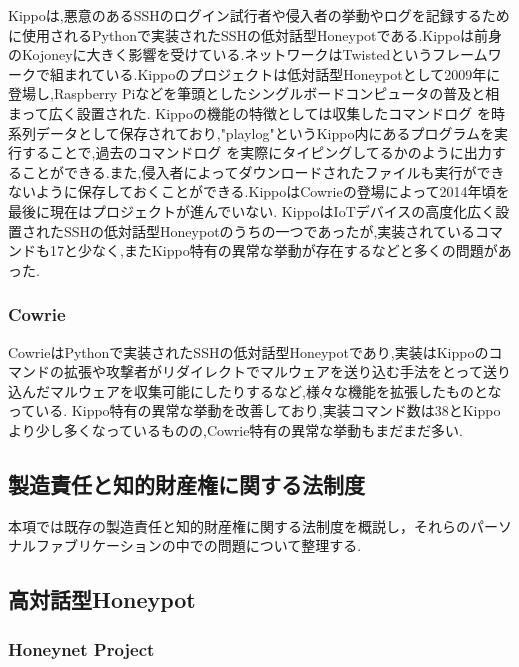 Kippoは,悪意のあるSSHのログイン試行者や侵入者の挙動やログを記録するために使用されるPythonで実装されたSSHの低対話型Honeypotである.\cite{kippo}Kippoは前身のKojoney\cite{kojoney}に大きく影響を受けている.ネットワークはTwisted\cite{twisted}というフレームワークで組まれている.Kippoのプロジェクトは低対話型Honeypotとして2009年に登場し,Raspberry Pi\cite{rasp}などを筆頭としたシングルボードコンピュータ\cite{singleboard}の普及と相まって広く設置された.
Kippoの機能の特徴としては収集したコマンドログ を時系列データとして保存されており,"playlog"というKippo内にあるプログラムを実行することで,過去のコマンドログ を実際にタイピングしてるかのように出力することができる.また,侵入者によってダウンロードされたファイルも実行ができないように保存しておくことができる.KippoはCowrieの登場によって2014年頃を最後に現在はプロジェクトが進んでいない.\cite{kippowiki}
KippoはIoTデバイスの高度化広く設置されたSSHの低対話型Honeypotのうちの一つであったが,実装されているコマンドも17\cite{kippocommand}と少なく,またKippo特有の異常な挙動が存在するなどと多くの問題があった.

\subsubsection{Cowrie}
\label{tech:Cowrie}
CowrieはPythonで実装されたSSHの低対話型Honeypotであり,実装はKippoのコマンドの拡張や攻撃者がリダイレクトでマルウェアを送り込む手法をとって送り込んだマルウェアを収集可能にしたりするなど,様々な機能を拡張したものとなっている.
Kippo特有の異常な挙動を改善しており,実装コマンド数は38\cite{cowriecommand}とKippoより少し多くなっているものの\cite{differfromkippo},Cowrie特有の異常な挙動もまだまだ多い.

\subsection{製造責任と知的財産権に関する法制度}
\label{tech:lows}

本項では既存の製造責任と知的財産権に関する法制度を概説し，それらのパーソナルファブリケーションの中での問題について整理する.

\subsection{高対話型Honeypot}
\label{tech:HighInteractionHoneypot}

\subsubsection{Honeynet Project}
\label{tech:Honeynet}

